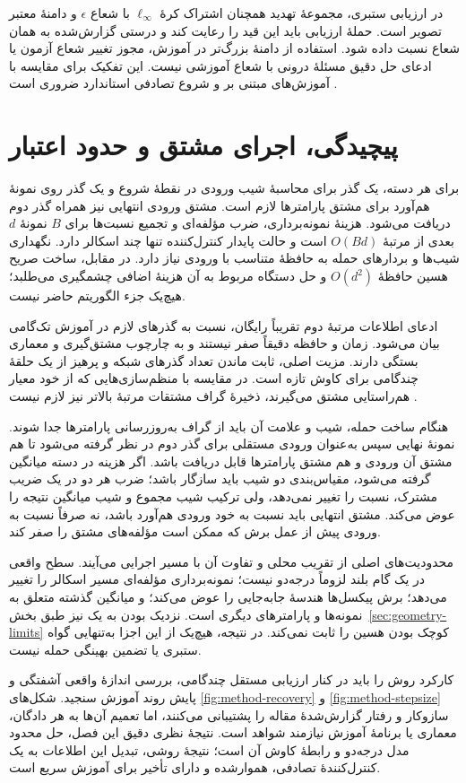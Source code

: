 در ارزیابی ستبری، مجموعهٔ تهدید همچنان اشتراک کرهٔ $\ell_\infty$ با شعاع $\epsilon$ و دامنهٔ معتبر تصویر است. حملهٔ ارزیابی باید این قید را رعایت کند و درستی گزارش‌شده به همان شعاع نسبت داده شود. استفاده از دامنهٔ بزرگ‌تر در آموزش، مجوز تغییر شعاع آزمون یا ادعای حل دقیق مسئلهٔ درونی با شعاع آموزشی نیست. این تفکیک برای مقایسه با آموزش‌های مبتنی بر  و شروع تصادفی استاندارد ضروری است \cite{madry2018towards,wong2020fast,sora2026}.

\section{پیچیدگی، اجرای مشتق و حدود اعتبار}
\label{sec:method-complexity}

برای هر دسته، یک گذر برای محاسبهٔ شیب ورودی در نقطهٔ شروع و یک گذر روی نمونهٔ هم‌آورد برای مشتق پارامترها لازم است. مشتق ورودی انتهایی نیز همراه گذر دوم دریافت می‌شود. هزینهٔ نمونه‌برداری، ضرب مؤلفه‌ای و تجمیع نسبت‌ها برای $B$ نمونهٔ $d$بعدی از مرتبهٔ $O(Bd)$ است و حالت پایدار کنترل‌کننده تنها چند اسکالر دارد. نگهداری شیب‌ها و بردارهای حمله به حافظهٔ متناسب با ورودی نیاز دارد. در مقابل، ساخت صریح هسین حافظهٔ $O(d^2)$ و حل دستگاه مربوط به آن هزینهٔ اضافی چشمگیری می‌طلبد؛ هیچ‌یک جزء الگوریتم حاضر نیست.

ادعای اطلاعات مرتبهٔ دوم تقریباً رایگان، نسبت به گذرهای لازم در آموزش تک‌گامی بیان می‌شود. زمان و حافظه دقیقاً صفر نیستند و به چارچوب مشتق‌گیری و معماری بستگی دارند. مزیت اصلی، ثابت ماندن تعداد گذرهای شبکه و پرهیز از یک حلقهٔ چندگامی برای کاوش تازه است. در مقایسه با منظم‌سازی‌هایی که از خود معیار هم‌راستایی مشتق می‌گیرند، ذخیرهٔ گراف مشتقات مرتبهٔ بالاتر نیز لازم نیست \cite{andriushchenko2020understanding,sora2026}.

هنگام ساخت حمله، شیب و علامت آن باید از گراف به‌روزرسانی پارامترها جدا شوند. نمونهٔ نهایی سپس به‌عنوان ورودی مستقلی برای گذر دوم در نظر گرفته می‌شود تا هم مشتق آن ورودی و هم مشتق پارامترها قابل دریافت باشد. اگر هزینه در دسته میانگین گرفته می‌شود، مقیاس‌بندی دو شیب باید سازگار باشد؛ ضرب هر دو در یک ضریب مشترک، نسبت را تغییر نمی‌دهد، ولی ترکیب شیب مجموع و شیب میانگین نتیجه را عوض می‌کند. مشتق انتهایی باید نسبت به خود ورودی هم‌آورد باشد، نه صرفاً نسبت به ورودی پیش از عمل برش که ممکن است مؤلفه‌های مشتق را صفر کند.

محدودیت‌های اصلی از تقریب محلی و تفاوت آن با مسیر اجرایی می‌آیند. سطح واقعی در یک گام بلند لزوماً درجه‌دو نیست؛ نمونه‌برداری مؤلفه‌ای مسیر اسکالر را تغییر می‌دهد؛ برش پیکسل‌ها هندسهٔ جابه‌جایی را عوض می‌کند؛ و میانگین گذشته متعلق به نمونه‌ها و پارامترهای دیگری است. نزدیک بودن \pertalign{} به یک نیز طبق بخش~\ref{sec:geometry-limits} کوچک بودن هسین را ثابت نمی‌کند. در نتیجه، هیچ‌یک از این اجزا به‌تنهایی گواه ستبری یا تضمین بهینگی حمله نیست.

کارکرد روش را باید در کنار ارزیابی مستقل چندگامی، بررسی اندازهٔ واقعی آشفتگی و پایش روند آموزش سنجید. شکل‌های \ref{fig:method-recovery} و \ref{fig:method-stepsize} سازوکار و رفتار گزارش‌شدهٔ مقاله را پشتیبانی می‌کنند، اما تعمیم آن‌ها به هر دادگان، معماری یا برنامهٔ آموزش نیازمند شواهد است. نتیجهٔ نظری دقیق این فصل، حل محدود مدل درجه‌دو و رابطهٔ کاوش آن است؛ نتیجهٔ روشی، تبدیل این اطلاعات به یک کنترل‌کنندهٔ تصادفی، هموارشده و دارای تأخیر برای آموزش سریع است.

